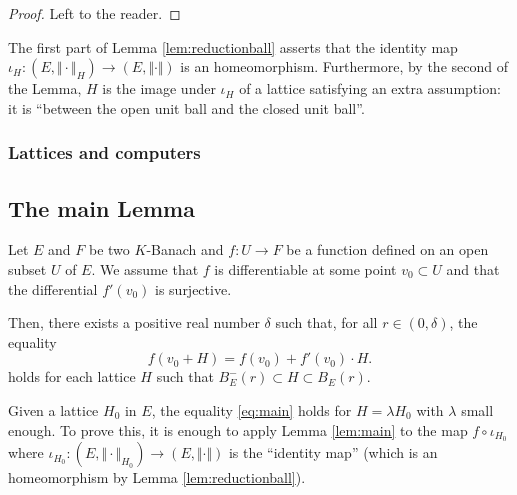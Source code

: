 \documentclass{amsart}
\begin{document}
\begin{proof}
Left to the reader.
\end{proof}

The first part of Lemma \ref{lem:reductionball} asserts that the 
identity map $\iota_H : (E, \Vert \cdot \Vert_H) \to (E, \Vert \cdot 
\Vert)$ is an homeomorphism. Furthermore, by the second of the Lemma, 
$H$ is the image under $\iota_H$ of a lattice satisfying an extra 
assumption: it is ``between the open unit ball and the closed unit 
ball''.

\subsubsection*{Lattices and computers}


\subsection{The main Lemma}

\begin{lem} \label{lem:main}
Let $E$ and $F$ be two $K$-Banach and $f : U 
\rightarrow F$ be a function defined on an open subset $U$ of $E$.
We assume that $f$ is differentiable at some point $v_0 \subset 
U$ and that the differential $f'(v_0)$ is surjective. 

Then, there exists a positive real number $\delta$ such that, for all $r 
\in (0, \delta)$, the equality
\begin{equation}
\label{eq:main}
f(v_0 + H) = f(v_0) + f'(v_0) \cdot H.
\end{equation}
holds for each lattice $H$ such that $B^-_E(r) \subset H \subset
B_E(r)$.
\end{lem}

\begin{rmk}
Given a lattice $H_0$ in $E$, the equality \eqref{eq:main} holds for $H 
= \lambda H_0$ with $\lambda$ small enough. To prove this, it is enough 
to apply Lemma \ref{lem:main} to the map $f \circ \iota_{H_0}$ where 
$\iota_{H_0} : (E, \Vert \cdot \Vert_{H_0}) \to (E, \Vert \cdot \Vert)$ 
is the ``identity map'' (which is an homeomorphism by Lemma 
\ref{lem:reductionball}).
\end{rmk}
\end{document}

